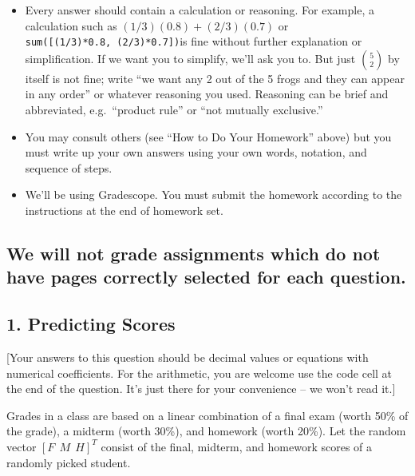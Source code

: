\documentclass[11pt]{article}
\providecommand{\tightlist}{%
      \setlength{\itemsep}{0pt}\setlength{\parskip}{0pt}}
\begin{document}
\begin{itemize}
\tightlist
\item
  Every answer should contain a calculation or reasoning. For example, a
  calculation such as \((1/3)(0.8) + (2/3)(0.7)\) or
  \texttt{sum({[}(1/3)*0.8,\ (2/3)*0.7{]})}is fine without further
  explanation or simplification. If we want you to simplify, we'll ask
  you to. But just \({5 \choose 2}\) by itself is not fine; write ``we
  want any 2 out of the 5 frogs and they can appear in any order'' or
  whatever reasoning you used. Reasoning can be brief and abbreviated,
  e.g.~``product rule'' or ``not mutually exclusive.''
\item
  You may consult others (see ``How to Do Your Homework'' above) but you
  must write up your own answers using your own words, notation, and
  sequence of steps.
\item
  We'll be using Gradescope. You must submit the homework according to
  the instructions at the end of homework set.
\end{itemize}

\hypertarget{we-will-not-grade-assignments-which-do-not-have-pages-correctly-selected-for-each-question.}{%
\subsection{\texorpdfstring{\textbf{We will not grade assignments which
do not have pages correctly selected for each
question.}}{We will not grade assignments which do not have pages correctly selected for each question.}}\label{we-will-not-grade-assignments-which-do-not-have-pages-correctly-selected-for-each-question.}}

    \newpage

    \hypertarget{predicting-scores}{%
\subsection{1. Predicting Scores}\label{predicting-scores}}

{[}Your answers to this question should be decimal values or equations
with numerical coefficients. For the arithmetic, you are welcome use the
code cell at the end of the question. It's just there for your
convenience -- we won't read it.{]}

Grades in a class are based on a linear combination of a final exam
(worth 50\% of the grade), a midterm (worth 30\%), and homework (worth
20\%). Let the random vector \([F ~~ M ~~ H]^T\) consist of the final,
midterm, and homework scores of a randomly picked student.
\end{document}
